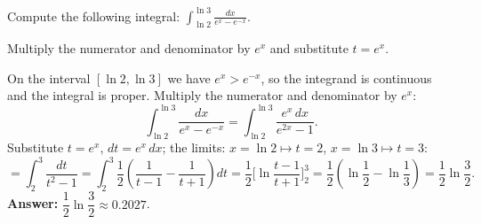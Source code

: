 
\begin{question}
Compute the following integral: $\displaystyle\int_{\ln2}^{\ln3}\frac{dx}{e^x-e^{-x}}$.
\end{question}

\begin{hint}
Multiply the numerator and denominator by $e^x$ and substitute $t=e^x$.
\end{hint}

\begin{solution}
On the interval $[\ln2,\ln3]$ we have $e^x>e^{-x}$, so the integrand is continuous and the integral is proper. Multiply the numerator and denominator by $e^x$:
\[ \int_{\ln2}^{\ln3}\frac{dx}{e^x-e^{-x}} = \int_{\ln2}^{\ln3}\frac{e^x\,dx}{e^{2x}-1}. \]
Substitute $t=e^x$, $dt=e^x\,dx$; the limits: $x=\ln2\mapsto t=2$, $x=\ln3\mapsto t=3$:
\[ = \int_2^3\frac{dt}{t^2-1} = \int_2^3\frac12\left(\frac{1}{t-1}-\frac{1}{t+1}\right)dt = \frac12\Big[\ln\frac{t-1}{t+1}\Big]_2^3 = \frac12\left(\ln\frac12-\ln\frac13\right) = \frac12\ln\frac32. \]
\textbf{Answer:} $\dfrac12\ln\dfrac32\approx0.2027$.
\end{solution}
